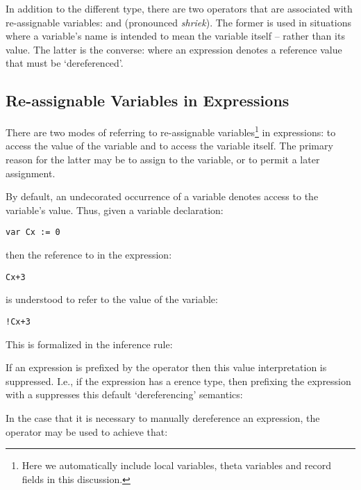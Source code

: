 In addition to the different type, there are two operators that are associated with re-assignable variables:  and \q{!} (pronounced \emph{shriek}). The former is used in situations where a variable's name is intended to mean the variable itself -- rather than its value. The latter is the converse: where an expression denotes a reference value that must be `dereferenced'.

\subsection{Re-assignable Variables in Expressions}
\label{referRef}
There are two modes of referring to re-assignable variables\footnote{Here we automatically include local variables, theta variables and record fields in this discussion.} in expressions: to access the value of the variable and to access the variable itself. The primary reason for the latter may be to assign to the variable, or to permit a later assignment.

By default, an undecorated occurrence of a variable denotes access to the variable's value. Thus, given a variable declaration:
\begin{lstlisting}
var Cx := 0
\end{lstlisting}
then the reference to  in the expression:
\begin{lstlisting}
Cx+3
\end{lstlisting}
is understood to refer to the value of the variable:
\begin{lstlisting}
!Cx+3
\end{lstlisting}
This is formalized in the inference rule:
\begin{prooftree}
\end{prooftree}

If an expression is prefixed by the  operator then this value interpretation is suppressed. I.e., if the expression has a erence type, then prefixing the expression with a  suppresses this default `dereferencing' semantics:

\begin{prooftree}
\end{prooftree}

In the case that it is necessary to manually dereference an expression, the \q{!} operator may be used to achieve that:
\begin{prooftree}
\end{prooftree}

